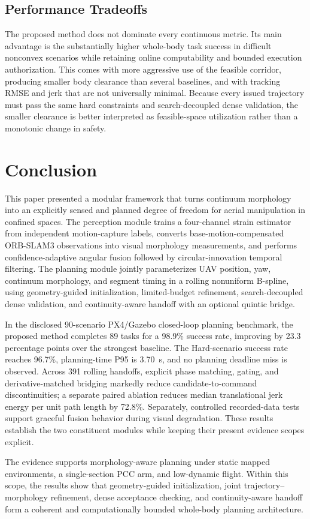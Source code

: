 \documentclass[journal,twoside]{IEEEtran}
\begin{document}
\subsection{Performance Tradeoffs}
The proposed method does not dominate every continuous metric. Its main advantage is the substantially higher whole-body task success in difficult nonconvex scenarios while retaining online computability and bounded execution authorization. This comes with more aggressive use of the feasible corridor, producing smaller body clearance than several baselines, and with tracking RMSE and jerk that are not universally minimal. Because every issued trajectory must pass the same hard constraints and search-decoupled dense validation, the smaller clearance is better interpreted as feasible-space utilization rather than a monotonic change in safety.

\section{Conclusion}
This paper presented a modular framework that turns continuum morphology into an explicitly sensed and planned degree of freedom for aerial manipulation in confined spaces. The perception module trains a four-channel strain estimator from independent motion-capture labels, converts base-motion-compensated ORB-SLAM3 observations into visual morphology measurements, and performs confidence-adaptive angular fusion followed by circular-innovation temporal filtering. The planning module jointly parameterizes UAV position, yaw, continuum morphology, and segment timing in a rolling nonuniform B-spline, using geometry-guided initialization, limited-budget refinement, search-decoupled dense validation, and continuity-aware handoff with an optional quintic bridge.

In the disclosed 90-scenario PX4/Gazebo closed-loop planning benchmark, the proposed method completes 89 tasks for a 98.9\% success rate, improving by 23.3 percentage points over the strongest baseline. The Hard-scenario success rate reaches 96.7\%, planning-time P95 is 3.70~s, and no planning deadline miss is observed. Across 391 rolling handoffs, explicit phase matching, gating, and derivative-matched bridging markedly reduce candidate-to-command discontinuities; a separate paired ablation reduces median translational jerk energy per unit path length by 72.8\%. Separately, controlled recorded-data tests support graceful fusion behavior during visual degradation. These results establish the two constituent modules while keeping their present evidence scopes explicit.

The evidence supports morphology-aware planning under static mapped environments, a single-section PCC arm, and low-dynamic flight. Within this scope, the results show that geometry-guided initialization, joint trajectory--morphology refinement, dense acceptance checking, and continuity-aware handoff form a coherent and computationally bounded whole-body planning architecture.

\balance


\end{document}

